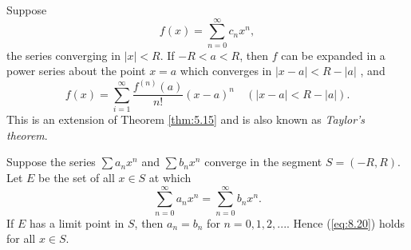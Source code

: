 \begin{thm}
    \label{thm:8.4}
    Suppose
    \begin{equation*}
        f(x) = \sum_{n=0}^{\infty} c_n x^n ,
    \end{equation*}
    the series converging in $\left| x \right| < R$. 
    If $-R < a < R$, then $f$ can be expanded in a power series about the point $x = a$ which converges in $| x - a | < R - | a |$ , and
    \begin{equation}
        \label{eq:8.17}
        f(x) = 
        \sum_{i=1}^{\infty} 
        \frac{f^{(n)}(a)}{n!}\left( x - a \right)^n
        \quad
        (\left| x - a \right| < R - \left| a \right|) .
    \end{equation}
    This is an extension of Theorem \ref{thm:5.15} and is also known as \emph{Taylor's theorem}.
\end{thm}


\begin{thm}
    \label{thm:8.5}
    Suppose the series $\sum a_n x^n$ and $\sum b_n x^n$ converge in the segment $S = (-R, R)$. 
    Let $E$ be the set of all $x \in S$ at which
    \begin{equation}
        \label{eq:8.20}
        \sum_{n=0}^{\infty} a_n x^n =
        \sum_{n=0}^{\infty} b_n x^n .
    \end{equation}
    If $E$ has a limit point in $S$, 
    then $a_n = b_n$ for $n = 0, 1, 2, ...$. 
    Hence (\ref{eq:8.20}) holds for all $x \in S$.
\end{thm}


